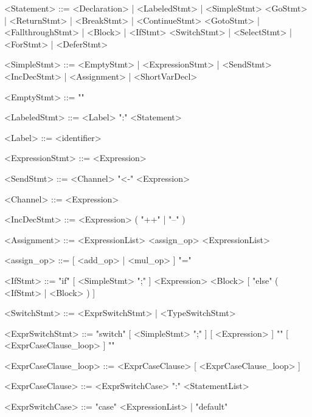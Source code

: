 \documentclass{article}
\begin{document}
    \begin{grammar}

        <Statement>             ::=     <Declaration> | <LabeledStmt> | <SimpleStmt>
                                \alt    <GoStmt> | <ReturnStmt> | <BreakStmt> | <ContinueStmt> 
                                \alt    <GotoStmt> | <FallthroughStmt> | <Block> | <IfStmt>
                                \alt    <SwitchStmt> | <SelectStmt> | <ForStmt> | <DeferStmt>

        <SimpleStmt>            ::=     <EmptyStmt> | <ExpressionStmt> | <SendStmt>
                                \alt    <IncDecStmt> | <Assignment> | <ShortVarDecl>

        <EmptyStmt>             ::=     ""

        <LabeledStmt>           ::=     <Label> ":" <Statement>

        <Label>                 ::=     <identifier>

        <ExpressionStmt>        ::=     <Expression>

        <SendStmt>              ::=     <Channel> "<-" <Expression>

        <Channel>               ::=     <Expression>

        <IncDecStmt>            ::=     <Expression> ( "++" | "--" )

        <Assignment>            ::=     <ExpressionList> <assign_op> <ExpressionList>

        <assign_op>             ::=     [ <add_op> | <mul_op> ] "="

        <IfStmt>                ::=     "if" [ <SimpleStmt> ";" ] <Expression> <Block> [ "else" ( <IfStmt> | <Block> ) ]

        <SwitchStmt>            ::=     <ExprSwitchStmt> | <TypeSwitchStmt>
        
        <ExprSwitchStmt>        ::=     "switch" [ <SimpleStmt> ";" ] [ <Expression> ] "{" [ <ExprCaseClause_loop> ] "}"
        
        <ExprCaseClause_loop>   ::=     <ExprCaseClause> [ <ExprCaseClause_loop> ]

        <ExprCaseClause>        ::=     <ExprSwitchCase> ":" <StatementList>

        <ExprSwitchCase>        ::=     "case" <ExpressionList> | "default"


\end{grammar}
\end{document}
